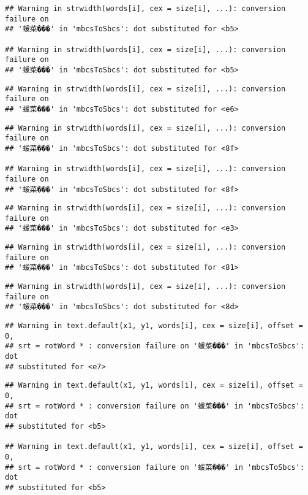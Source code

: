 \documentclass[]{article}
\begin{document}
\begin{verbatim}
## Warning in strwidth(words[i], cex = size[i], ...): conversion failure on
## '蝯菜���' in 'mbcsToSbcs': dot substituted for <b5>

## Warning in strwidth(words[i], cex = size[i], ...): conversion failure on
## '蝯菜���' in 'mbcsToSbcs': dot substituted for <b5>
\end{verbatim}

\begin{verbatim}
## Warning in strwidth(words[i], cex = size[i], ...): conversion failure on
## '蝯菜���' in 'mbcsToSbcs': dot substituted for <e6>
\end{verbatim}

\begin{verbatim}
## Warning in strwidth(words[i], cex = size[i], ...): conversion failure on
## '蝯菜���' in 'mbcsToSbcs': dot substituted for <8f>

## Warning in strwidth(words[i], cex = size[i], ...): conversion failure on
## '蝯菜���' in 'mbcsToSbcs': dot substituted for <8f>
\end{verbatim}

\begin{verbatim}
## Warning in strwidth(words[i], cex = size[i], ...): conversion failure on
## '蝯菜���' in 'mbcsToSbcs': dot substituted for <e3>
\end{verbatim}

\begin{verbatim}
## Warning in strwidth(words[i], cex = size[i], ...): conversion failure on
## '蝯菜���' in 'mbcsToSbcs': dot substituted for <81>
\end{verbatim}

\begin{verbatim}
## Warning in strwidth(words[i], cex = size[i], ...): conversion failure on
## '蝯菜���' in 'mbcsToSbcs': dot substituted for <8d>
\end{verbatim}

\begin{verbatim}
## Warning in text.default(x1, y1, words[i], cex = size[i], offset = 0,
## srt = rotWord * : conversion failure on '蝯菜���' in 'mbcsToSbcs': dot
## substituted for <e7>
\end{verbatim}

\begin{verbatim}
## Warning in text.default(x1, y1, words[i], cex = size[i], offset = 0,
## srt = rotWord * : conversion failure on '蝯菜���' in 'mbcsToSbcs': dot
## substituted for <b5>

## Warning in text.default(x1, y1, words[i], cex = size[i], offset = 0,
## srt = rotWord * : conversion failure on '蝯菜���' in 'mbcsToSbcs': dot
## substituted for <b5>
\end{verbatim}
\end{document}
